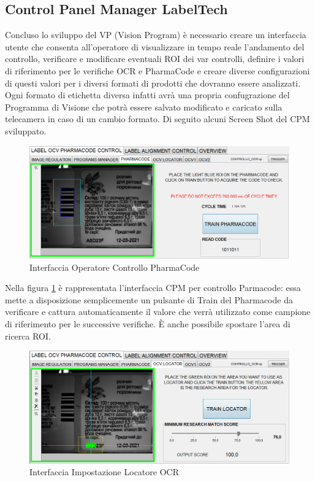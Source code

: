 \documentclass[12pt, a4paper, oneside]{book}
\begin{document}
\subsection{Control Panel Manager LabelTech}
Concluso lo sviluppo del VP (Vision Program) è necessario creare un interfaccia utente che consenta all'operatore di visualizzare in tempo reale l'andamento del controllo, verificare e modificare eventuali ROI dei var controlli, definire i valori di riferimento per le verifiche OCR e PharmaCode e creare diverse configurazioni di questi valori per i diversi formati di prodotti che dovranno essere analizzati. Ogni formato di etichetta diversa infatti avrà una propria confugrazione del Programma di Visione che potrà essere salvato modificato e caricato sulla telecamera in caso di un cambio formato. Di seguito alcuni Screen Shot del CPM sviluppato.

\begin{figure}[H]
	\centering
	\includegraphics[width=13cm]{Immagini/VIS14}
	\caption{Interfaccia Operatore Controllo PharmaCode}
	\label{vis14}
\end{figure}

Nella figura \ref{vis14} è rappresentata l'interfaccia CPM per controllo Parmacode: essa mette a disposizione semplicemente un pulsante di Train del Pharmacode da verificare e cattura automaticamente il valore che verrà utilizzato come campione di riferimento per le successive verifiche. È anche possibile spostare l'area di ricerca ROI.


\begin{figure}[H]
	\centering
	\includegraphics[width=13cm]{Immagini/VIS15}
	\caption{Interfaccia Impostazione Locatore OCR}
	\label{vis15}
\end{figure}
\end{document}
